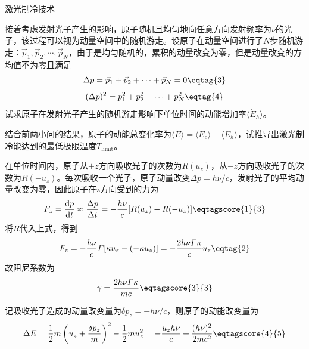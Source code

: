 \documentclass[answer]{cphos}
\begin{document}
\begin{problem}[40]{激光制冷技术}
\begin{problemstatement}
 接着考虑发射光子产生的影响，原子随机且均匀地向任意方向发射频率为$\nu$的光子，该过程可以视为动量空间中的随机游走。设原子在动量空间进行了$N$步随机游走：$\vec{p}_1, \vec{p}_2, \cdots, \vec{p}_N$，由于是均匀随机的，累积的动量改变为零，但是动量改变的方均值不为零且满足
\begin{equation}
    \Delta p = \vec{p}_1 + \vec{p}_2 + \cdots + \vec{p}_N = 0 \eqtag{3}
\end{equation}
\begin{equation}
    (\Delta p)^2 = p_1^2 + p_2^2 + \cdots + p_N^2 \eqtag{4}
\end{equation}
试求原子在发射光子产生的随机游走影响下单位时间的动能增加率$\langle \dot{E}_h \rangle$。

 结合前两小问的结果，原子的动能总变化率为$\langle \dot{E} \rangle = \langle \dot{E}_c \rangle + \langle \dot{E}_h \rangle$，试推导出激光制冷能达到的最低极限温度$T_{\text{limit}}$。

\end{problemstatement}

\begin{solution}
在单位时间内，原子从$+z$方向吸收光子的次数为$R(u_z)$，从$-z$方向吸收光子的次数为$R(-u_z)$。每次吸收一个光子，原子动量改变$\Delta p = h\nu/c$，发射光子的平均动量改变为零，因此原子在z方向受到的力为
\begin{equation}
    F_z =\frac{\mathrm{d}p}{\mathrm{d}t}\approx \frac{\Delta p}{\Delta t}=-\frac{h\nu}{c} [R(u_z) - R(-u_z)] \eqtagscore{1}{3}
\end{equation}
将$R$代入上式，得到
\begin{equation}
    F_z = -\frac{h\nu}{c} \varGamma [\kappa u_z - (-\kappa u_z)] = -\frac{2h\nu\varGamma\kappa}{c} u_z \eqtag{2}
\end{equation}
故阻尼系数为
\begin{equation}
    \gamma = \frac{2h\nu\varGamma\kappa}{mc} \eqtagscore{3}{3}
\end{equation}

记吸收光子造成的动量改变量为$\delta p_z = -h\nu/c$，则原子的动能改变量为
\begin{equation}
    \Delta E = \frac{1}{2}m\left( u_z+\frac{\delta p_z}{m} \right)^2-\frac{1}{2}mu_z^2=-\frac{u_zh\nu}{c}+\frac{(h\nu)^2}{2mc^2} \eqtagscore{4}{5} \label{eq:4}
\end{equation}


\end{solution}
\end{problem}
\end{document}
